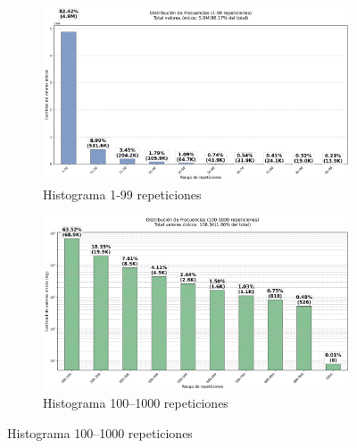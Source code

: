 \begin{figure}[htbp]
    \centering
    \begin{subfigure}[t]{0.48\textwidth-1em}
        \includegraphics[width=\linewidth]{img/histograma_1-99_identifier_Mobility_Data_Slim.png}
        \caption{Histograma 1-99 repeticiones}
        \label{fig:sub1}
    \end{subfigure}
    \hfill
    \begin{subfigure}[t]{0.48\textwidth-1em}
        \includegraphics[width=\linewidth]{img/histograma_100-1k_identifier_Mobility_Data_Slim.png}
        \caption{Histograma 100–1000 repeticiones}
        \label{fig:sub2}
    \end{subfigure}

    \vspace{0.5cm}


\end{figure}
